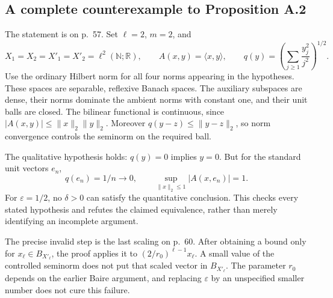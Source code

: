 \documentclass[10pt]{article}
\begin{document}
\subsection*{A complete counterexample to Proposition A.2}
The statement is on p. 57. Set \(\ell=2\), \(m=2\), and \[X_1=X_2=X'_1=X'_2=\ell^2(\mathbb N;\mathbb R),\qquad
 A(x,y)=\langle x,y\rangle,\qquad
 q(y)=\left(\sum_{j\ge1}\frac{y_j^2}{j^2}\right)^{1/2}.\] Use the ordinary Hilbert norm for all four norms appearing in the hypotheses. These spaces are separable, reflexive Banach spaces. The auxiliary subspaces are dense, their norms dominate the ambient norms with constant one, and their unit balls are closed. The bilinear functional is continuous, since \(|A(x,y)|\le\|x\|_2\|y\|_2\). Moreover \(q(y-z)\le\|y-z\|_2\), so norm convergence controls the seminorm on the required ball.\par
The qualitative hypothesis holds: \(q(y)=0\) implies \(y=0\). But for the standard unit vectors \(e_n\), \[q(e_n)=1/n\longrightarrow0,\qquad
 \sup_{\|x\|_2\le1}|A(x,e_n)|=1.\] For \(\varepsilon=1/2\), no \(\delta>0\) can satisfy the quantitative conclusion. This checks every stated hypothesis and refutes the claimed equivalence, rather than merely identifying an incomplete argument.\par
The precise invalid step is the last scaling on p. 60. After obtaining a bound only for \(x_\ell\in B_{X'_\ell}\), the proof applies it to \((2/r_0)^{\ell-1}x_\ell\). A small value of the controlled seminorm does not put that scaled vector in \(B_{X'_\ell}\). The parameter \(r_0\) depends on the earlier Baire argument, and replacing \(\varepsilon\) by an unspecified smaller number does not cure this failure.\par
\end{document}
